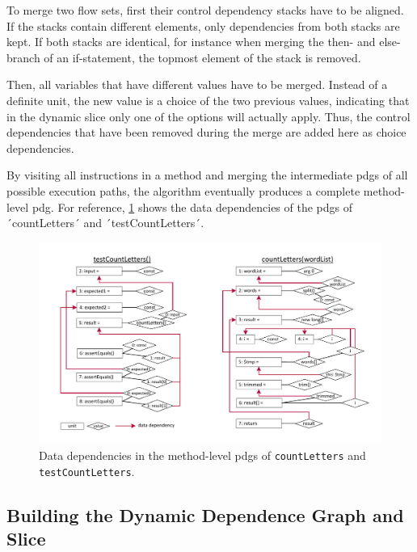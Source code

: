 To merge two flow sets, first their control dependency stacks have to be aligned.
If the stacks contain different elements, only dependencies from both stacks are kept.
If both stacks are identical, for instance when merging the then- and else-branch of an if-statement, the topmost element of the stack is removed.

Then, all variables that have different values have to be merged.
Instead of a definite unit, the new value is a choice of the two previous values, indicating that in the dynamic slice only one of the options will actually apply.
Thus, the control dependencies that have been removed during the merge are added here as choice dependencies.

By visiting all instructions in a method and merging the intermediate \acp{pdg} of all possible execution paths, the algorithm eventually produces a complete method-level \ac{pdg}.
For reference, \cref{fig:graph_static} shows the data dependencies of the \acp{pdg} of ´countLetters´ and ´testCountLetters´.

\begin{figure}[t]
\centering
\includegraphics[width=.90\linewidth, clip, trim=12mm 7mm 7mm 7mm]{img/graph_static}
\caption{Data dependencies in the method-level \aclp{pdg} of \lstinline+countLetters+ and \lstinline+testCountLetters+.}
\label{fig:graph_static}
\end{figure}

\subsection{Building the Dynamic Dependence Graph and Slice}




